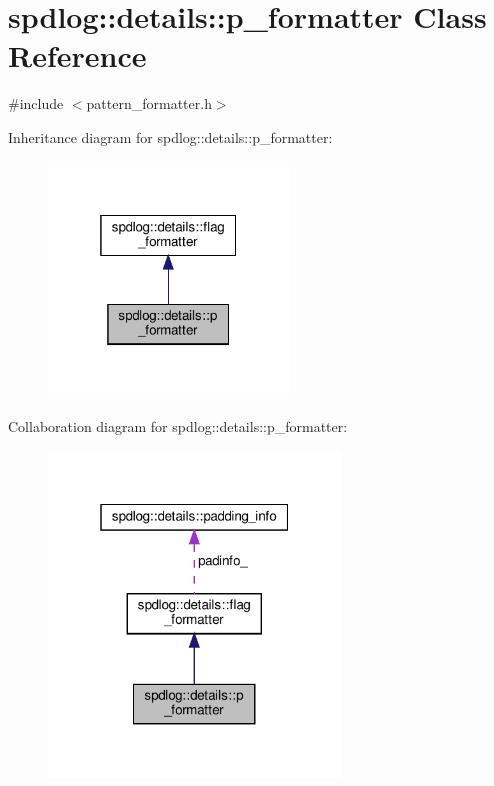 \hypertarget{classspdlog_1_1details_1_1p__formatter}{}\section{spdlog\+:\+:details\+:\+:p\+\_\+formatter Class Reference}
\label{classspdlog_1_1details_1_1p__formatter}


{\ttfamily \#include $<$pattern\+\_\+formatter.\+h$>$}



Inheritance diagram for spdlog\+:\+:details\+:\+:p\+\_\+formatter\+:
\nopagebreak
\begin{figure}[H]
\begin{center}
\leavevmode
\includegraphics[width=181pt]{classspdlog_1_1details_1_1p__formatter__inherit__graph}
\end{center}
\end{figure}


Collaboration diagram for spdlog\+:\+:details\+:\+:p\+\_\+formatter\+:
\nopagebreak
\begin{figure}[H]
\begin{center}
\leavevmode
\includegraphics[width=220pt]{classspdlog_1_1details_1_1p__formatter__coll__graph}
\end{center}
\end{figure}
